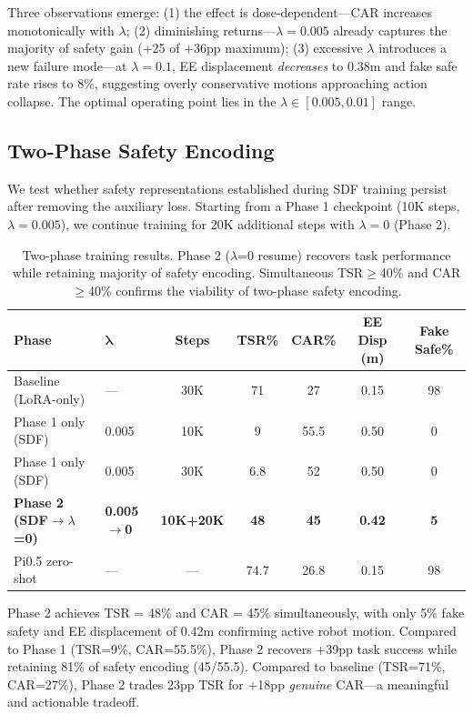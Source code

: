 \documentclass[letterpaper]{article}
\begin{document}
Three observations emerge: (1) the effect is dose-dependent---CAR increases monotonically with $\lambda$; (2) diminishing returns---$\lambda=0.005$ already captures the majority of safety gain (+25 of +36pp maximum); (3) excessive $\lambda$ introduces a new failure mode---at $\lambda=0.1$, EE displacement \emph{decreases} to 0.38m and fake safe rate rises to 8\%, suggesting overly conservative motions approaching action collapse. The optimal operating point lies in the $\lambda \in [0.005, 0.01]$ range.

\subsection{Two-Phase Safety Encoding}
\label{sec:two_phase}

We test whether safety representations established during SDF training persist after removing the auxiliary loss. Starting from a Phase 1 checkpoint (10K steps, $\lambda=0.005$), we continue training for 20K additional steps with $\lambda=0$ (Phase 2).

\begin{table}[h]
\centering
\caption{Two-phase training results. Phase 2 ($\lambda$=0 resume) recovers task performance while retaining majority of safety encoding. Simultaneous TSR$\geq$40\% and CAR$\geq$40\% confirms the viability of two-phase safety encoding.}
\label{tab:phase2}
\begin{tabular}{llccccc}
\toprule
\textbf{Phase} & $\boldsymbol{\lambda}$ & \textbf{Steps} & \textbf{TSR\%} & \textbf{CAR\%} & \textbf{EE Disp (m)} & \textbf{Fake Safe\%} \\
\midrule
Baseline (LoRA-only) & --- & 30K & 71 & 27 & 0.15 & 98 \\
Phase 1 only (SDF) & 0.005 & 10K & 9 & 55.5 & 0.50 & 0 \\
Phase 1 only (SDF) & 0.005 & 30K & 6.8 & 52 & 0.50 & 0 \\
\textbf{Phase 2 (SDF$\to\lambda$=0)} & \textbf{0.005$\to$0} & \textbf{10K+20K} & \textbf{48} & \textbf{45} & \textbf{0.42} & \textbf{5} \\
Pi0.5 zero-shot & --- & --- & 74.7 & 26.8 & 0.15 & 98 \\
\bottomrule
\end{tabular}
\end{table}

Phase 2 achieves TSR = 48\% and CAR = 45\% simultaneously, with only 5\% fake safety and EE displacement of 0.42m confirming active robot motion. Compared to Phase 1 (TSR=9\%, CAR=55.5\%), Phase 2 recovers +39pp task success while retaining 81\% of safety encoding (45/55.5). Compared to baseline (TSR=71\%, CAR=27\%), Phase 2 trades 23pp TSR for +18pp \emph{genuine} CAR---a meaningful and actionable tradeoff.
\end{document}
